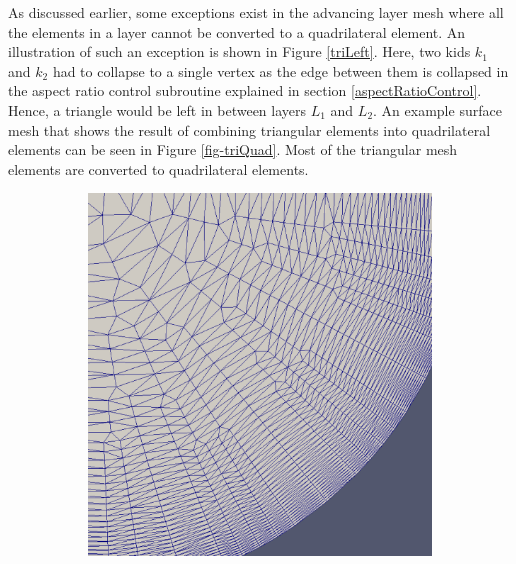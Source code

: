 As discussed earlier, some exceptions exist in the advancing layer mesh where all the elements in a layer cannot be converted to a quadrilateral element. An illustration of such an exception is shown in Figure \ref{triLeft}. Here, two kids $k_1$ and $k_2$ had to collapse to a single vertex as the edge between them is collapsed in the aspect ratio control subroutine explained in section \ref{aspectRatioControl}. Hence, a triangle would be left in between layers $L_1$ and $L_2$. An example surface mesh that shows the result of combining triangular elements into quadrilateral elements can be seen in Figure \ref{fig-triQuad}. Most of the triangular mesh elements are converted to quadrilateral elements.

\begin{figure}
	\centering
	\begin{subfigure}{0.5\textwidth}
		\includegraphics[width=0.9\linewidth]{img/m2/combine-tris-to-quads/combineTrisToQuads1.eps}
		\caption{}
		\label{fig-triQuad1}
	\end{subfigure}%
	\begin{subfigure}{0.5\textwidth}

\end{subfigure}
\end{figure}
